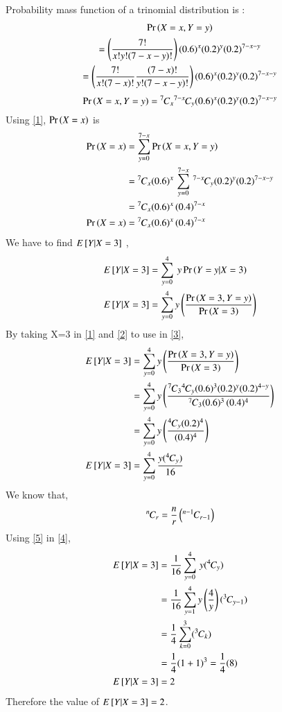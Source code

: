Probability mass function of a trinomial  distribution is :
\begin{multline}
   \Pr\left(X=x,Y=y\right) \\=\left(\frac{7!}{x!y!(7-x-y)!}\right)(0.6)^x(0.2)^y(0.2)^{7-x-y}\\
  \nonumber  =\left(\frac{7!}{x!(7-x)!}\frac{(7-x)!}{y!(7-x-y)!}\right)(0.6)^x(0.2)^y(0.2)^{7-x-y}
\end{multline}
\begin{equation}
    \Pr\left(X=x,Y=y\right)={{}^{7}\mkern-1muC_{x}}{{}^{7-x}\mkern-1muC_{y}}(0.6)^x(0.2)^y(0.2)^{7-x-y}\label{1}
\end{equation}
Using \eqref{1}, $\Pr\left(X=x\right)$ is 
\begin{align}
   \nonumber \Pr\left(X=x\right)&=\sum_{y=0}^{7-x} \Pr\left(X=x,Y=y\right)\\
  \nonumber &={{}^{7}\mkern-1muC_{x}}(0.6)^x\,\sum_{y=0}^{7-x}\, {{}^{7-x}\mkern-1muC_{y}} (0.2)^y(0.2)^{7-x-y} \\
  \nonumber  &={{}^{7}\mkern-1muC_{x}}(0.6)^x\,{(0.4)^{7-x}}\\
    \Pr\left(X=x\right)&={{}^{7}\mkern-1muC_{x}}(0.6)^x\,{(0.4)^{7-x}}\label{2}
\end{align}
We have to find $E\left[ Y|X=3 \right]$ ,
\begin{align}
    E\left[ Y|X=3 \right]&=\sum_{y=0}^4 \: y \Pr\left(Y=y|X=3\right)\\
    E\left[ Y|X=3 \right]&=\sum_{y=0}^4 y \left(  \frac{ \Pr\left(X=3,Y=y\right)}{\Pr\left(X=3\right)} \right)\label{3}
\end{align}
By taking X=3 in \eqref{1} and \eqref{2}  to use in \eqref{3},
\begin{align}
   \nonumber E\left[ Y|X=3 \right]&=\sum_{y=0}^4 y \left( \frac{ \Pr\left(X=3,Y=y\right)}{\Pr\left(X=3\right)}\right)\\
  \nonumber  &=\sum_{y=0}^4 y   \left(\frac{{{}^{7}\mkern-1muC_{3}}{{}^{4}\mkern-1muC_{y}}(0.6)^3(0.2)^y(0.2)^{4-y}}{{{}^{7}\mkern-1muC_{3}}(0.6)^3\,{(0.4)^{4}}}\right)\\
 \nonumber &=\sum_{y=0}^4 y   \left(\frac{{{}^{4}\mkern-1muC_{y}}(0.2)^{4}}{{(0.4)^{4}}}\right)\\
 E\left[ Y|X=3 \right]&=\sum_{y=0}^4 {\frac{y({{}^{4}\mkern-1muC_{y}})}{{16}}}\label{4}
 \end{align}
 We know that,
 \begin{align}
     {{}^{n}\mkern-1muC_{r}} = \frac{n}{r}\left({{}^{n-1}\mkern-1muC_{r-1}}\right)\label{5}
 \end{align}
 Using \eqref{5} in \eqref{4},
 \begin{align}
  E\left[ Y|X=3 \right]&=\frac{1}{16}\sum_{y=0}^4\, {y({{}^{4}\mkern-1muC_{y}})}\\
  &=\frac{1}{16}\sum_{y=1}^{4} y\left(\frac{4}{y}\right)({{}^{3}\mkern-1muC_{y-1}})\\
  &=\frac{1}{4}\sum_{k=0}^{3}({{}^{3}\mkern-1muC_{k}})\\
  &=\frac{1}{4}(1+1)^3=\frac{1}{4}(8)\\
  E\left[ Y|X=3 \right]&=2
\end{align}
Therefore the value of $E\left[ Y|X=3 \right]=2$.